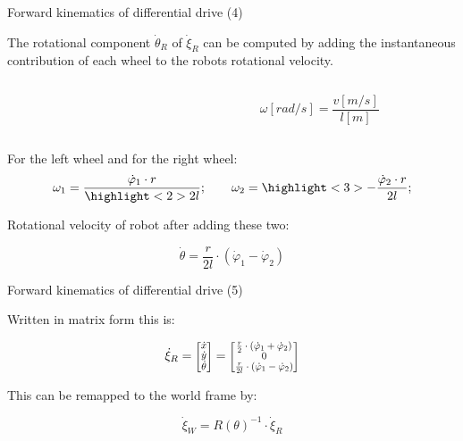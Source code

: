 \documentclass[compress]{beamer}
\newcommand{\colvec}[2][.8]{%
  \scalebox{#1}{%
    \renewcommand{\arraystretch}{.8}%
    $\begin{bmatrix}#2\end{bmatrix}$%
  }
}
\begin{document}
\begin{frame}{Forward kinematics of differential drive (4)}

    The rotational component $\dot\theta_R$ of $\dot\xi_R$ can be computed by adding the instantaneous
contribution of each wheel to the robots rotational velocity.

    \begin{columns}
        \begin{column}{0.5\linewidth}
            \centering

        \end{column}
        \begin{column}{0.5\linewidth}
            \[
                \omega [rad/s] = \frac{v [m/s]}{l [m]}
            \]
        \end{column}
    \end{columns}


For the left wheel and for the right wheel:
\[
    \omega_1 = \frac{\dot\varphi_1\cdot r}{\highlight<2>{2l}};\qquad \omega_2 = \highlight<3>{-}\frac{\dot\varphi_2\cdot r}{2l};
\]

Rotational velocity of robot after adding these two:

\[
    \dot\theta = \frac{r}{2l}\cdot (\dot\varphi_1 - \dot\varphi_2)
\]

\end{frame}

\begin{frame}{Forward kinematics of differential drive (5)}

Written in matrix form this is:

\[
    \dot\xi_R = \colvec{\dot{x} \\ \dot{y} \\ \dot\theta} = \colvec{\frac{r}{2}\cdot (\dot\varphi_1 + \dot\varphi_2) \\ 0 \\ \frac{r}{2l}\cdot (\dot\varphi_1 - \dot\varphi_2)}
\]


This can be remapped to the world frame by:

\[
    \dot\xi_W = R(\theta)^{-1}\cdot \dot\xi_R
\]

\end{frame}
\end{document}
